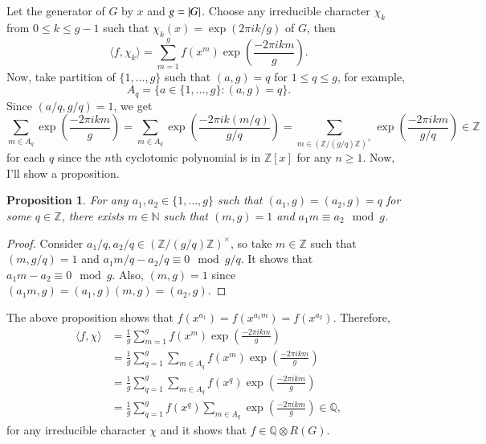 \documentclass[a4paper, 12pt]{article}
\theoremstyle{Mydefinition}
\theoremstyle{Mytheorem}
\newtheorem{proposition}[statement]{Proposition}
\begin{document}
Let the generator of $G$ by $x$ and $g=\abs{G}$. Choose any irreducible character $\chi_k$ from $0\leq k\leq g-1$ such that $\chi_k(x) = \exp(2\pi i k/g)$ of $G$, then
\begin{equation}
    \langle f, \chi_k\rangle = \sum_{m=1}^{g}f(x^m)\exp\left(\frac{-2\pi ikm}{g}\right).
\end{equation}
Now, take partition of $\{1, \ldots, g\}$ such that $(a, g)=q$ for $1\leq q\leq g$, for example, 
\begin{equation}
    A_q = \{a\in \{1, \ldots, g\}: (a,g)=q\}.
\end{equation}
Since $(a/q, g/q)=1$, we get
\begin{equation}
    \sum_{m\in A_q}\exp\left(\frac{-2\pi ikm}{g}\right) = \sum_{m\in A_q}\exp\left(\frac{-2\pi ik(m/q)}{g/q}\right) = \sum_{m\in (\mathbb{Z}/(g/q)\mathbb{Z})^\times}\exp\left(\frac{-2\pi ikm}{g/q}\right) \in \mathbb{Z}
\end{equation}
for each $q$ since the $n$th cyclotomic polynomial is in $\mathbb{Z}[x]$ for any $n\geq 1$. Now, I'll show a proposition.
\begin{proposition}
For any $a_1,a_2\in\{1, \ldots, g\}$ such that $(a_1,g)=(a_2,g)=q$ for some $q\in\mathbb{Z}$, there exists $m\in\mathbb{N}$ such that $(m,g)=1$ and $a_1m\equiv a_2\mod g$.
\end{proposition}
\begin{proof}
Consider $a_1/q,a_2/q\in (\mathbb{Z}/(g/q)\mathbb{Z})^\times$, so take $m\in \mathbb{Z}$ such that $(m,g/q)=1$ and $a_1m/q-a_2/q\equiv 0\mod g/q$. It shows that $a_1m-a_2\equiv 0\mod g$. Also, $(m,g)=1$ since $(a_1m,g)=(a_1,g)(m,g)=(a_2,g)$.
\end{proof}
The above proposition shows that $f(x^{a_1})=f(x^{a_1m})=f(x^{a_2})$. Therefore,
\begin{equation}
\begin{split}
    \langle f, \chi\rangle &= \frac{1}{g}\sum_{m=1}^{g}f(x^m)\exp\left(\frac{-2\pi ikm}{g}\right)\\
    &=\frac{1}{g}\sum_{q=1}^{g}\sum_{m\in A_q}f(x^m)\exp\left(\frac{-2\pi ikm}{g}\right)\\
    &=\frac{1}{g}\sum_{q=1}^{g}\sum_{m\in A_q}f(x^q)\exp\left(\frac{-2\pi ikm}{g}\right)\\
    &=\frac{1}{g}\sum_{q=1}^{g}f(x^q)\sum_{m\in A_q}\exp\left(\frac{-2\pi ikm}{g}\right)\in\mathbb{Q},
\end{split}
\end{equation}
for any irreducible character $\chi$ and it shows that $f\in\mathbb{Q}\otimes R(G)$.
\end{document}
